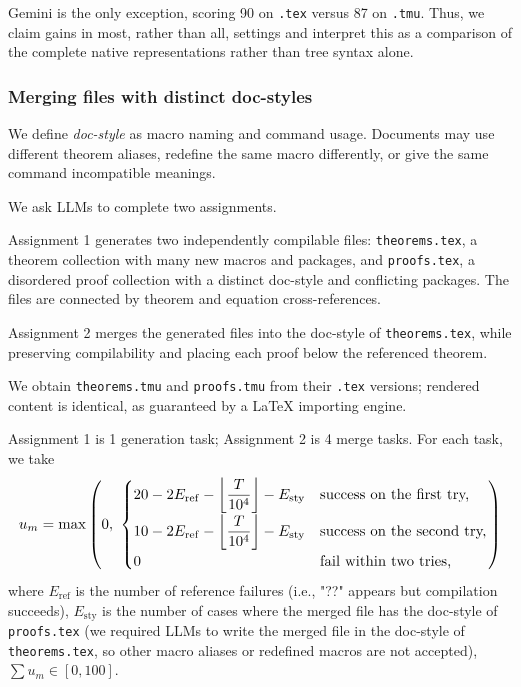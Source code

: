 Gemini is the only exception, scoring 90 on \texttt{.tex} versus 87 on \texttt{.tmu}. Thus, we claim gains in most, rather than all, settings and interpret this as a comparison of the complete native representations rather than tree syntax alone.

\subsubsection{Merging files with distinct doc-styles}
\label{sec:doc-style}

We define \emph{doc-style} as macro naming and command usage. Documents may use different theorem aliases, redefine the same macro differently, or give the same command incompatible meanings.

We ask LLMs to complete two assignments.

Assignment 1 generates two independently compilable files: \texttt{theorems.tex}, a theorem collection with many new macros and packages, and \texttt{proofs.tex}, a disordered proof collection with a distinct doc-style and conflicting packages. The files are connected by theorem and equation cross-references.

Assignment 2 merges the generated files into the doc-style of \texttt{theorems.tex}, while preserving compilability and placing each proof below the referenced theorem.

We obtain \texttt{theorems.tmu} and \texttt{proofs.tmu} from their \texttt{.tex} versions; rendered content is identical, as guaranteed by a \LaTeX{} importing engine.

Assignment 1 is 1 generation task; Assignment 2 is 4 merge tasks. For each task, we take
\begin{equation*}
\resizebox{\columnwidth}{!}{$
u_m =
\max\left(0,\
\begin{cases}
20 - 2E_{\mathrm{ref}} - \left\lfloor \dfrac{T}{10^4} \right\rfloor - E_{\mathrm{sty}}
    & \text{success on the first try,} \\[6pt]
10 - 2E_{\mathrm{ref}} - \left\lfloor \dfrac{T}{10^4} \right\rfloor - E_{\mathrm{sty}}
    & \text{success on the second try,} \\[6pt]
0
    & \text{fail within two tries,}
\end{cases}
\right)
$}
\end{equation*}
where $E_{\text{ref}}$ is the number of reference failures (i.e., "??" appears but compilation succeeds), $E_{\text{sty}}$ is the number of cases where the merged file has the doc-style of \texttt{proofs.tex} (we required LLMs to write the merged file in the doc-style of \texttt{theorems.tex}, so other macro aliases or redefined macros are not accepted), $\sum u_m \in [0, 100]$.

